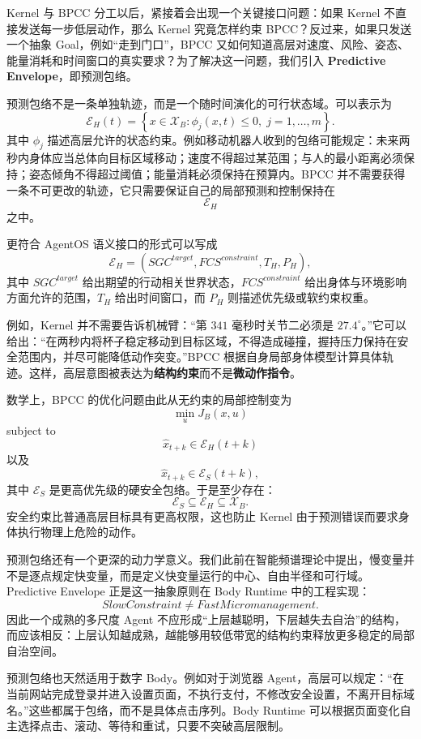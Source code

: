 Kernel 与 BPCC 分工以后，紧接着会出现一个关键接口问题：如果 Kernel 不直接发送每一步低层动作，那么 Kernel 究竟怎样约束 BPCC？反过来，如果只发送一个抽象 Goal，例如“走到门口”，BPCC 又如何知道高层对速度、风险、姿态、能量消耗和时间窗口的真实要求？为了解决这一问题，我们引入 \textbf{Predictive Envelope}，即预测包络。

预测包络不是一条单独轨迹，而是一个随时间演化的可行状态域。可以表示为
\[
\mathcal E_H(t)
=
\left\{
x\in\mathcal X_B:
\phi_j(x,t)\leq0,\;
j=1,\ldots,m
\right\}.
\]
其中 $\phi_j$ 描述高层允许的状态约束。例如移动机器人收到的包络可能规定：未来两秒内身体应当总体向目标区域移动；速度不得超过某范围；与人的最小距离必须保持；姿态倾角不得超过阈值；能量消耗必须保持在预算内。BPCC 并不需要获得一条不可更改的轨迹，它只需要保证自己的局部预测和控制保持在
\[
\mathcal E_H
\]
之中。

更符合 AgentOS 语义接口的形式可以写成
\[
\mathcal E_H
=
\left(
SGC^{target},
FCS^{constraint},
T_H,
P_H
\right),
\]
其中 $SGC^{target}$ 给出期望的行动相关世界状态，$FCS^{constraint}$ 给出身体与环境影响方面允许的范围，$T_H$ 给出时间窗口，而 $P_H$ 则描述优先级或软约束权重。

例如，Kernel 并不需要告诉机械臂：“第 $341$ 毫秒时关节二必须是 $27.4^\circ$。”它可以给出：“在两秒内将杯子稳定移动到目标区域，不得造成碰撞，握持压力保持在安全范围内，并尽可能降低动作突变。”BPCC 根据自身局部身体模型计算具体轨迹。这样，高层意图被表达为\textbf{结构约束}而不是\textbf{微动作指令}。

数学上，BPCC 的优化问题由此从无约束的局部控制变为
\[
\min_{u}
J_B(x,u)
\]
subject to
\[
\hat x_{t+k}\in\mathcal E_H(t+k)
\]
以及
\[
\hat x_{t+k}\in\mathcal E_S(t+k),
\]
其中 $\mathcal E_S$ 是更高优先级的硬安全包络。于是至少存在：
\[
\mathcal E_S
\subseteq
\mathcal E_H
\subseteq
\mathcal X_B.
\]
安全约束比普通高层目标具有更高权限，这也防止 Kernel 由于预测错误而要求身体执行物理上危险的动作。

预测包络还有一个更深的动力学意义。我们此前在智能频谱理论中提出，慢变量并不是逐点规定快变量，而是定义快变量运行的中心、自由半径和可行域。Predictive Envelope 正是这一抽象原则在 Body Runtime 中的工程实现：
\[
SlowConstraint
\neq
FastMicromanagement.
\]
因此一个成熟的多尺度 Agent 不应形成“上层越聪明，下层越失去自治”的结构，而应该相反：上层认知越成熟，越能够用较低带宽的结构约束释放更多稳定的局部自治空间。

预测包络也天然适用于数字 Body。例如对于浏览器 Agent，高层可以规定：“在当前网站完成登录并进入设置页面，不执行支付，不修改安全设置，不离开目标域名。”这些都属于包络，而不是具体点击序列。Body Runtime 可以根据页面变化自主选择点击、滚动、等待和重试，只要不突破高层限制。

